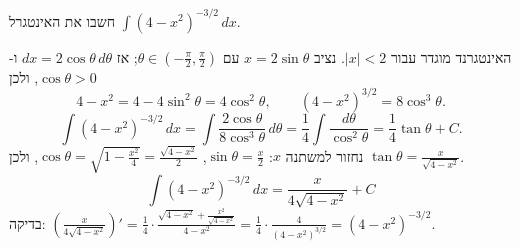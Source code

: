 
\begin{question}
חשבו את האינטגרל $\displaystyle\int(4-x^2)^{-3/2}\,dx$. \quad [\underline{רמז}: אפשר להציב $x=2\sin\theta$.]
\end{question}

\begin{solution}
האינטגרנד מוגדר עבור $|x|<2$. נציב $x=2\sin\theta$ עם $\theta\in\left(-\frac\pi2,\frac\pi2\right)$; אז $dx=2\cos\theta\,d\theta$ ו-$\cos\theta>0$, ולכן
\[ 4-x^2=4-4\sin^2\theta=4\cos^2\theta,\qquad (4-x^2)^{3/2}=8\cos^3\theta. \]
\[ \int(4-x^2)^{-3/2}\,dx=\int\frac{2\cos\theta}{8\cos^3\theta}\,d\theta=\frac14\int\frac{d\theta}{\cos^2\theta}=\frac14\tan\theta+C. \]
נחזור למשתנה $x$: $\sin\theta=\frac x2$, $\cos\theta=\sqrt{1-\frac{x^2}{4}}=\frac{\sqrt{4-x^2}}{2}$, ולכן $\tan\theta=\frac{x}{\sqrt{4-x^2}}$.
\[ \boxed{\int(4-x^2)^{-3/2}\,dx=\frac{x}{4\sqrt{4-x^2}}+C} \]
בדיקה: $\left(\frac{x}{4\sqrt{4-x^2}}\right)'=\frac14\cdot\frac{\sqrt{4-x^2}+\frac{x^2}{\sqrt{4-x^2}}}{4-x^2}=\frac14\cdot\frac{4}{(4-x^2)^{3/2}}=(4-x^2)^{-3/2}$.
\end{solution}
